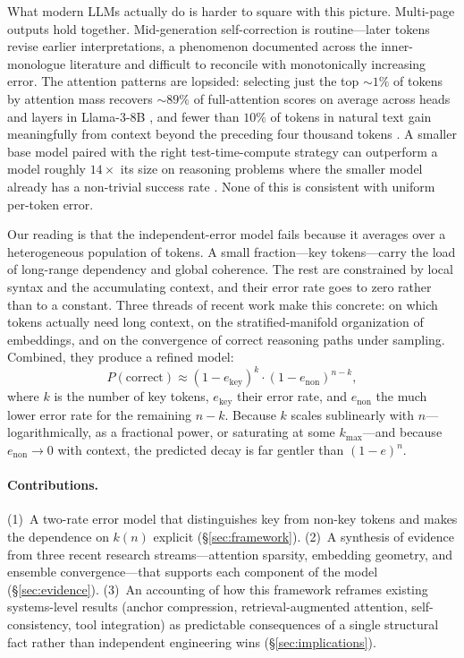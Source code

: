 What modern LLMs actually do is harder to square with this picture. Multi-page outputs hold together. Mid-generation self-correction is routine---later tokens revise earlier interpretations, a phenomenon documented across the inner-monologue literature \citep{gwern2023inner} and difficult to reconcile with monotonically increasing error. The attention patterns are lopsided: selecting just the top $\sim 1\%$ of tokens by attention mass recovers $\sim 89\%$ of full-attention scores on average across heads and layers in Llama-3-8B \citep{liu2024retrieval}, and fewer than $10\%$ of tokens in natural text gain meaningfully from context beyond the preceding four thousand tokens \citep{fang2024what}. A smaller base model paired with the right test-time-compute strategy can outperform a model roughly $14\times$ its size on reasoning problems where the smaller model already has a non-trivial success rate \citep{snell2024scaling}. None of this is consistent with uniform per-token error.

Our reading is that the independent-error model fails because it averages over a heterogeneous population of tokens. A small fraction---key tokens---carry the load of long-range dependency and global coherence. The rest are constrained by local syntax and the accumulating context, and their error rate goes to zero rather than to a constant. Three threads of recent work make this concrete: \citet{fang2024what} on which tokens actually need long context, \citet{li2025unraveling} on the stratified-manifold organization of embeddings, and \citet{wang2023self} on the convergence of correct reasoning paths under sampling. Combined, they produce a refined model:
\begin{equation}
\label{eq:two-rate}
P(\text{correct}) \approx (1-e_{\text{key}})^k \cdot (1-e_{\text{non}})^{n-k},
\end{equation}
where $k$ is the number of key tokens, $e_{\text{key}}$ their error rate, and $e_{\text{non}}$ the much lower error rate for the remaining $n-k$. Because $k$ scales sublinearly with $n$---logarithmically, as a fractional power, or saturating at some $k_{\max}$---and because $e_{\text{non}} \to 0$ with context, the predicted decay is far gentler than $(1-e)^n$.

\paragraph{Contributions.}
(1)~A two-rate error model that distinguishes key from non-key tokens and makes the dependence on $k(n)$ explicit (\S\ref{sec:framework}). (2)~A synthesis of evidence from three recent research streams---attention sparsity, embedding geometry, and ensemble convergence---that supports each component of the model (\S\ref{sec:evidence}). (3)~An accounting of how this framework reframes existing systems-level results (anchor compression, retrieval-augmented attention, self-consistency, tool integration) as predictable consequences of a single structural fact rather than independent engineering wins (\S\ref{sec:implications}).

